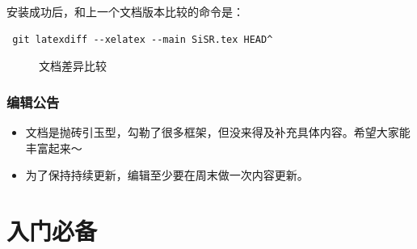 \documentclass[cn,11pt,chinese,twoside]{elegantbook}
\begin{document}
安装成功后，和上一个文档版本比较的命令是：
\begin{verbatim}
 git latexdiff --xelatex --main SiSR.tex HEAD^
\end{verbatim}


\begin{figure}[h!]
\centering
{}
\caption{文档差异比较}
\label{fig:367}
\end{figure}



\section*{编辑公告}
\begin{itemize}
\item 文档是抛砖引玉型，勾勒了很多框架，但没来得及补充具体内容。希望大家能丰富起来～
\item 为了保持持续更新，编辑至少要在周末做一次内容更新。
\end{itemize}





\part{入门必备}

\end{document}
